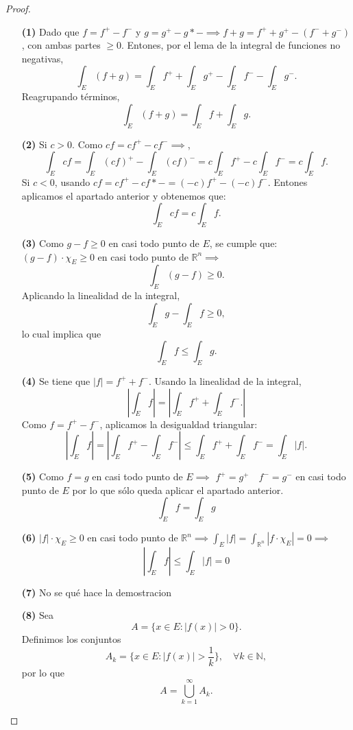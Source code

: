 \begin{proof}
    \begin{enumerate}
        \item[\textbf{(1)}] Dado que $f = f^+ - f^-$ y $g = g^+ - g*- \implies f + g = f^+ + g^+ - (f^- + g^-)$, con ambas partes $\geq 0$. Entones,  
        por el lema de la integral de funciones no negativas,  
        $$ \int_E (f+g) = \int_E f^+ + \int_E g^+ - \int_E f^- - \int_E g^-. $$  
        Reagrupando términos,  
        $$ \int_E (f+g) = \int_E f + \int_E g. $$


        \item[\textbf{(2)}]  
        Si $ c > 0 $. Como $ c f = cf^+ - c f^- \implies$,  
        $$ \int_E c f = \int_E (c f)^+ - \int_E (c f)^- = c \int_E f^+ - c \int_E f^- = c \int_E f. $$  
        Si $ c < 0 $, usando $ c f = cf^+-cf*- = (-c)f^+ - (-c)f^-$. Entones aplicamos el apartado anterior y obtenemos que: 
        $$ \int_E c f = c \int_E f. $$ 
    
        \item[\textbf{(3)}] Como $g - f \geq 0$ en casi todo punto de $E$, se cumple que: $(g-f)\cdot\chi_{E} \geq 0$ en casi todo punto de $\mathbb{R}^n \implies$
        $$ \int_E (g - f) \geq 0. $$  
        Aplicando la linealidad de la integral,  
        $$ \int_E g - \int_E f \geq 0, $$  
        lo cual implica que  
        $$ \int_E f \leq \int_E g. $$
    
        \item[\textbf{(4)}] Se tiene que $|f| = f^+ + f^-$. Usando la linealidad de la integral,  
        $$ |\int_E f| = |\int_E f^+ + \int_E f^-. |$$  
        Como $f = f^+ - f^-$, aplicamos la desigualdad triangular:  
        $$ \left| \int_E f \right| = \left| \int_E f^+ - \int_E f^- \right| \leq \int_E f^+ + \int_E f^- = \int_E |f|. $$
    
        \item[\textbf{(5)}] Como $f = g$ en casi todo punto de $E \implies$  $f^+ = g^+ \quad f^- = g^-$ en casi todo punto de $E$ por lo que sólo queda aplicar el apartado anterior.   
        $$ \int_E f = \int_E g $$
    
        \item[\textbf{(6)}] $|f|\cdot\chi_{E} \geq 0$ en casi todo punto de $\mathbb{R}^n \implies \int_{E}|f| = \int_{\mathbb{R}^n}|f\cdot\chi_{E}| = 0 \implies$
        $$ |\int_{E}f| \leq \int_{E}|f| = 0$$
    
        \item[\textbf{(7)}] No se qué hace la demostracion
        \item[\textbf{(8)}] 
        Sea  
        $$ A = \{ x \in E : |f(x)| > 0 \}. $$  
        Definimos los conjuntos  
        $$ A_k = \{ x \in E : |f(x)| > \frac{1}{k} \}, \quad \forall k \in \mathbb{N}, $$  
        por lo que  
        $$ A = \bigcup_{k=1}^{\infty} A_k. $$  
        

\end{enumerate}
\end{proof}
